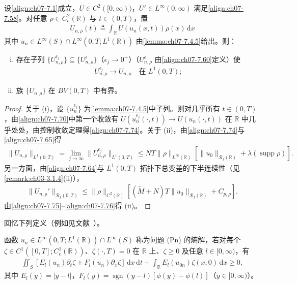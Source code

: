 \documentclass[../../main.tex]{subfiles}%
\begin{document}
\begin{lemma}\label{lemma:ch07-7.4.6}
设\eqref{align:ch07-7.1}成立，$U\in C^2([0,\infty))$，$U'\in L^\infty(0,\infty)$ 满足\eqref{align:ch07-7.58}。对任意 $\rho\in C^2_c(\mathbb{R})$ 与 $t\in(0,T)$，置
\begin{align}
U_{n,\rho}(t)\triangleq \int_{\mathbb{R}}U(u_n(x,t))\rho(x)\,\mathrm{d}x \label{align:ch07-7.73}
\end{align}
其中 $u_n\in L^\infty(S)\cap L^\infty(0,T;L^1(\mathbb{R}))$ 由\cref{lemma:ch07-7.4.5}给出。则：
\begin{enumerate}[(i)]
\item 存在子列 $\{U_{n,\rho}^{\epsilon_j}\}\subseteq\{U_{n,\rho}^\epsilon\}$（$\epsilon_j\to0^+$）（$U_{n,\rho}^\epsilon$ 由\eqref{align:ch07-7.60}定义）使
\begin{align}
U_{n,\rho}^{\epsilon_j}\to U_{n,\rho}\quad\text{在 }L^1(0,T); \label{align:ch07-7.74}
\end{align}
\item 族 $\{U_{n,\rho}\}$ 在 $BV(0,T)$ 中有界。
\end{enumerate}
\end{lemma}

\begin{proof}
关于 (i)，设 $\{u_n^{\epsilon_j}\}$ 为\cref{lemma:ch07-7.4.5}中子列。则对几乎所有 $t\in(0,T)$，由\eqref{align:ch07-7.70}中第一个收敛有 $U(u_n^{\epsilon_j}(\cdot,t))\to U(u_n(\cdot,t))$ 在 $\mathbb{R}$ 中几乎处处，由控制收敛定理得\eqref{align:ch07-7.74}。关于 (ii)，由\eqref{align:ch07-7.74}与\eqref{align:ch07-7.65}得
\begin{align}
\|U_{n,\rho}\|_{L^1(0,T)}=\lim_{j\to\infty}\|U_{n,\rho}^{\epsilon_j}\|_{L^1(0,T)}
\leqslant NT\|\rho\|_{L^\infty(\mathbb{R})}[\|u_0\|_{\mathscr{R}_f(\mathbb{R})}+\lambda(\operatorname{supp}\rho)]. \label{align:ch07-7.75}
\end{align}
另一方面，由\eqref{align:ch07-7.64}与 $L^1(0,T)$ 拓扑下总变差的下半连续性（见\cref{remark:ch03-3.1.4}(ii)），
\begin{align}
\|U_{n,\rho}'\|_{\mathscr{R}_f(0,T)}\leqslant\|\rho\|_{C^2(\mathbb{R})}[(\widetilde M+N)T\|u_0\|_{\mathscr{R}_f(\mathbb{R})}+C_{p,\rho}]. \label{align:ch07-7.76}
\end{align}
由\eqref{align:ch07-7.75}--\eqref{align:ch07-7.76}得 (ii)。
\end{proof}

回忆下列定义（例如见文献~\cite{ref34}）。

\begin{definition}\label{definition:ch07-Pn熵解}
函数 $u_n\in L^\infty(0,T;L^1(\mathbb{R}))\cap L^\infty(S)$ 称为问题 (Pn) 的熵解，若对每个 $\zeta\in C^1([0,T];C^1_c(\mathbb{R}))$、$\zeta(\cdot,T)=0$ 在 $\mathbb{R}$ 上、$\zeta\geqslant0$ 及任意 $l\in[0,\infty)$，有
\begin{align}
\iint_S[E_l(u_n)\partial_t\zeta+F_l(u_n)\partial_x\zeta]\,\mathrm{d}x\,\mathrm{d}t
+\int_{\mathbb{R}}E_l(u_{0n})\zeta(x,0)\,\mathrm{d}x\geqslant0, \label{align:ch07-7.77}
\end{align}
其中 $E_l(y)=|y-l|$，$F_l(y)=\operatorname{sgn}(y-l)[\phi(y)-\phi(l)]$（$y\in[0,\infty)$）。
\end{definition}
\end{document}
